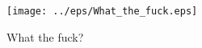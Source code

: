 \begin{figure}[htbp]
\begin{center}
\texttt{[image: ../eps/What\_the\_fuck.eps]} 
\caption{What the fuck?}
\label{label}
\end{center}
\end{figure}
\newpage


